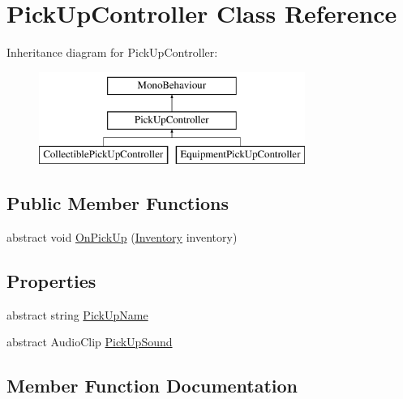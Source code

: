 \hypertarget{class_pick_up_controller}{}\section{Pick\+Up\+Controller Class Reference}
\label{class_pick_up_controller}
Inheritance diagram for Pick\+Up\+Controller\+:\begin{figure}[H]
\begin{center}
\leavevmode
\includegraphics[height=3.000000cm]{class_pick_up_controller}
\end{center}
\end{figure}
\subsection*{Public Member Functions}
\begin{DoxyCompactItemize}
\item 
abstract void \mbox{\hyperlink{class_pick_up_controller_a519293b33b3768cc3bdf0cb0f59a0dae}{On\+Pick\+Up}} (\mbox{\hyperlink{class_inventory}{Inventory}} inventory)
\end{DoxyCompactItemize}
\subsection*{Properties}
\begin{DoxyCompactItemize}
\item 
abstract string \mbox{\hyperlink{class_pick_up_controller_ab16ee19fb8d69f2c870cea6bfc60d325}{Pick\+Up\+Name}}
\item 
abstract Audio\+Clip \mbox{\hyperlink{class_pick_up_controller_a9f36ceeb2b16c62bbc15958cc4f18eec}{Pick\+Up\+Sound}}
\end{DoxyCompactItemize}


\subsection{Member Function Documentation}
\mbox{\label{class_pick_up_controller_a519293b33b3768cc3bdf0cb0f59a0dae}} 
